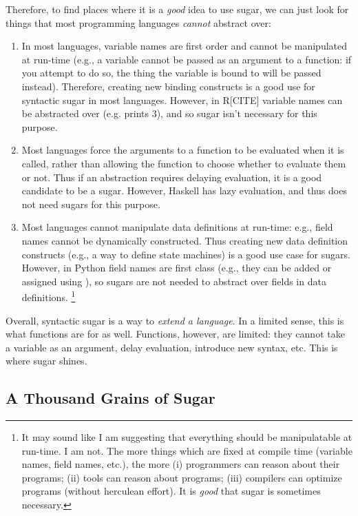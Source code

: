 Therefore, to find places where it is a \emph{good} idea to use sugar,
we can just look for things that most programming languages
\emph{cannot} abstract over:
\begin{enumerate}
  \item In most languages, variable names are first order and cannot
    be manipulated at run-time (e.g., a variable cannot be passed as
    an argument to a function: if you attempt to do so, the thing the
    variable is bound to will be passed instead). Therefore, creating
    new binding constructs is a good use for syntactic sugar in most
    languages. However, in R[CITE] variable names can be abstracted
    over (e.g.  prints 3), and so sugar isn't
    necessary for this purpose.
  \item Most languages force the arguments to a function to be
    evaluated when it is called, rather than allowing the function to
    choose whether to
    evaluate them or not. Thus if an abstraction requires delaying
    evaluation, it is a good candidate to be a sugar. However, Haskell
    has lazy evaluation, and thus does not need sugars for this purpose.
  \item Most languages cannot manipulate data definitions at run-time:
    e.g., field names cannot be dynamically constructed. Thus creating
    new data definition constructs (e.g., a way to define state
    machines) is a good use case for sugars. However, in Python field
    names are first class (e.g., they can be added or assigned using
    ), so sugars are not needed to abstract over fields
    in data definitions.
    \footnote{
    It may sound like I am suggesting that everything should be
    manipulatable at run-time. I am not. The more
    things which are fixed at compile time (variable names, field
    names, etc.), the more (i) programmers can reason about their
    programs; (ii) tools can reason about programs; (iii) compilers
    can optimize programs (without herculean effort). It is
    \emph{good} that sugar is sometimes necessary.
  }
\end{enumerate}

Overall, syntactic sugar is a way to \emph{extend a language}.
In a limited sense, this is what functions are for as well.
Functions, however, are limited: they cannot take a variable as an
argument, delay evaluation, introduce new syntax, etc. This is where
sugar shines.


\subsection{A Thousand Grains of Sugar}

